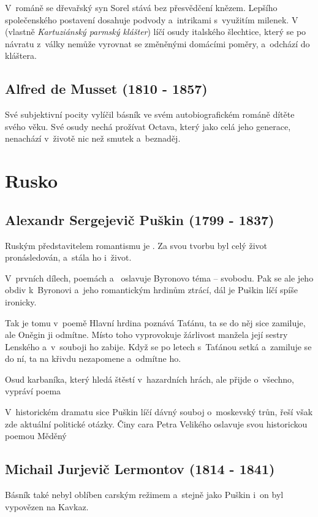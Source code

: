 V~románě  se dřevařský syn Sorel stává bez
přesvědčení knězem. Lepšího společenského postavení dosahuje podvody
a~intrikami s~využitím milenek. V~ (vlastně
\emph{Kartuziánský parmský klášter}) líčí osudy italského šlechtice,
který se po návratu z~války nemůže vyrovnat se změněnými domácími
poměry, a~odchází do kláštera.

\subsection*{Alfred de Musset (1810 - 1857)}
Své subjektivní pocity vylíčil básník  ve svém
autobiografickém románě  dítěte svého věku. Své osudy nechá
prožívat Octava, který jako celá jeho generace, nenachází v~životě nic
než smutek a~beznaděj.

\section{Rusko}
\subsection*{Alexandr Sergejevič Puškin (1799 - 1837)}
Ruským představitelem romantismu je .
Za svou tvorbu byl celý život pronásledován, a~stála ho i~život.

V~prvních dílech, poemách  a~
oslavuje Byronovo téma -- svobodu. Pak se ale jeho obdiv k~Byronovi
a~jeho romantickým hrdinům ztrácí, dál je Puškin líčí spíše ironicky.

Tak je tomu v~poemě  Hlavní hrdina poznává Taťánu,
ta se do něj sice zamiluje, ale Oněgin ji odmítne. Místo toho
vyprovokuje žárlivost manžela její sestry Lenského a~v~souboji ho
zabije. Když se po letech s~Taťánou setká a~zamiluje se do ní, ta na
křivdu nezapomene a~odmítne ho.

Osud karbaníka, který hledá štěstí v~hazardních hrách, ale přijde
o~všechno, vypráví poema 

V~historickém dramatu  sice Puškin líčí dávný souboj
o~moskevský trůn, řeší však zde aktuální politické otázky. Činy cara
Petra Velikého oslavuje svou historickou poemou Měděný 

\subsection*{Michail Jurjevič Lermontov (1814 - 1841)}
Básník  také nebyl oblíben carským
režimem a~stejně jako Puškin i~on byl vypovězen na Kavkaz.


